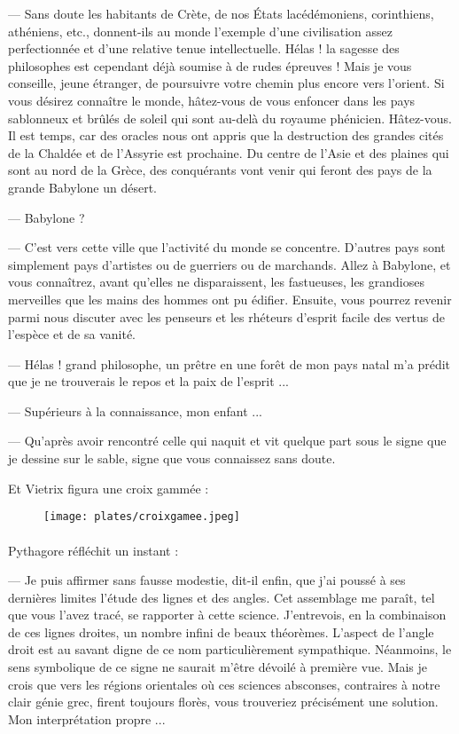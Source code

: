 \documentclass[a4paper, 11pt, oneside, polutonikogreek, french]{article}
\begin{document}
--- Sans doute les habitants de Crète, de nos États lacédémoniens, corinthiens, athéniens, etc., donnent-ils au monde l'exemple d'une civilisation assez perfectionnée et d'une relative tenue intellectuelle. Hélas ! la sagesse des philosophes est cependant déjà soumise à de rudes épreuves ! Mais je vous conseille, jeune étranger, de poursuivre votre chemin plus encore vers l'orient. Si vous désirez connaître le monde, hâtez-vous de vous enfoncer dans les pays sablonneux et brûlés de soleil qui sont au-delà du royaume phénicien. Hâtez-vous. Il est temps, car des oracles nous ont appris que la destruction des grandes cités de la Chaldée et de l'Assyrie est prochaine. Du centre de l'Asie et des plaines qui sont au nord de la Grèce, des conquérants vont venir qui feront des pays de la grande Babylone un désert.

--- Babylone ?

--- C'est vers cette ville que l'activité du monde se concentre. D'autres pays sont simplement pays d'artistes ou de guerriers ou de marchands. Allez à Babylone, et vous connaîtrez, avant qu'elles ne disparaissent, les fastueuses, les grandioses merveilles que les mains des hommes ont pu édifier. Ensuite, vous pourrez revenir parmi nous discuter avec les penseurs et les rhéteurs d'esprit facile des vertus de l'espèce et de sa vanité.

\bigskip
\centerline{\EightStarTaper}
\centerline{\EightStarTaper\EightStarTaper}
\bigskip

--- Hélas ! grand philosophe, un prêtre en une forêt de mon pays natal m'a prédit que je ne trouverais le repos et la paix de l'esprit ...

--- Supérieurs à la connaissance, mon enfant ...

--- Qu'après avoir rencontré celle qui naquit et vit quelque part sous le signe que je dessine sur le sable, signe que vous connaissez sans doute.

Et Vietrix figura une croix gammée :

\begin{figure}[H]
\centering
\texttt{[image: plates/croixgamee.jpeg]}
\end{figure}
\paragraph{}
Pythagore réfléchit un instant :

--- Je puis affirmer sans fausse modestie, dit-il enfin, que j'ai poussé à ses dernières limites l'étude des lignes et des angles. Cet assemblage me paraît, tel que vous l'avez tracé, se rapporter à cette science. J'entrevois, en la combinaison de ces lignes droites, un nombre infini de beaux théorèmes. L'aspect de l'angle droit est au savant digne de ce nom particulièrement sympathique. Néanmoins, le sens symbolique de ce signe ne saurait m'être dévoilé à première vue. Mais je crois que vers les régions orientales où ces sciences absconses, contraires à notre clair génie grec, firent toujours florès, vous trouveriez précisément une solution. Mon interprétation propre ...
\end{document}
